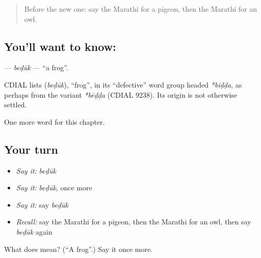 \label{lesson:MR-C142-beduk}



\begin{quote}
Before the new one: say the Marathi for a pigeon, then the Marathi for an owl.
\end{quote}

\subsection*{You'll want to know: }
\textbf{} — \emph{beḍūk} — \textquotedblleft{}a frog\textquotedblright{}.

\begin{cousinweb}
CDIAL lists \textbf{} (\emph{beḍūk}), \textquotedblleft{}frog\textquotedblright{}, in its \textquotedblleft{}defective\textquotedblright{} word group headed \emph{*biḍḍa}, as perhaps from the variant \emph{*bēḍḍa} (CDIAL 9238). Its origin is not otherwise settled.
\end{cousinweb}

\begin{grammarlens}[title={What you've built}]
One more word for this chapter.
\end{grammarlens}

\subsection*{Your turn}
\begin{itemize}
\raggedright
  \item \emph{Say it:} \emph{beḍūk}
  \item \emph{Say it:} \emph{beḍūk}, once more
  \item \emph{Say it:} say \emph{beḍūk}
  \item \emph{Recall:} say the Marathi for a pigeon, then the Marathi for an owl, then say \emph{beḍūk} again
\end{itemize}

\begin{tcolorbox}[breakable,colback=teal!4,colframe=teal!35!black,title={Before you move on}]
What does  mean? (\textquotedblleft{}A frog\textquotedblright{}.) Say it once more.
\end{tcolorbox}
